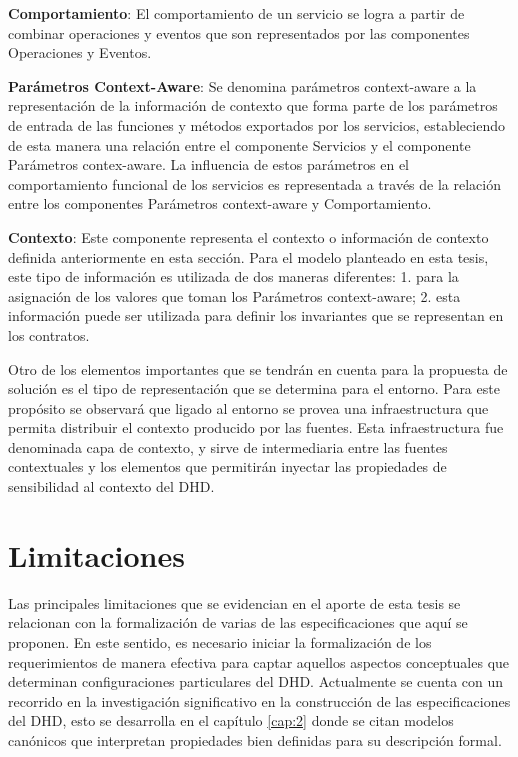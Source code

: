 {\textbf{Comportamiento}: El comportamiento de un servicio se logra a partir de
combinar operaciones y eventos que son representados por las componentes
Operaciones y Eventos. 

\textbf{Parámetros Context-Aware}: Se denomina parámetros context-aware a la
representación de la información de contexto que forma parte de los
parámetros de entrada de las funciones y métodos exportados por los servicios,
estableciendo de esta manera una relación entre el componente Servicios y el
componente Parámetros contex-aware. La influencia de estos parámetros en el
comportamiento funcional de los servicios es representada a través de
la relación entre los componentes Parámetros context-aware y Comportamiento.

\textbf{Contexto}: Este componente representa el contexto o información de
contexto definida anteriormente en esta sección. Para el modelo planteado en esta tesis, este tipo
de información es utilizada de dos maneras diferentes: 1. para la
asignación de los valores que toman los Parámetros context-aware; 2. esta información puede ser utilizada para definir los invariantes que se
representan en los contratos.

Otro de los elementos importantes que se tendrán en cuenta para la
propuesta de solución es el tipo de representación que se
determina para el entorno. Para este propósito se observará que ligado al
entorno se provea una infraestructura que permita distribuir el contexto
producido por las fuentes. Esta infraestructura fue denominada capa de contexto,
y sirve de intermediaria entre las fuentes contextuales y los elementos que
permitirán  inyectar las propiedades de sensibilidad al contexto del DHD.


\section{Limitaciones}	

Las principales limitaciones que se evidencian en el aporte de esta tesis se relacionan con la formalización de varias de las especificaciones que aquí se
proponen. En este sentido, es necesario iniciar la formalización de los
requerimientos de manera efectiva para captar aquellos aspectos conceptuales
que determinan configuraciones particulares del DHD. Actualmente se cuenta con
un recorrido en la investigación significativo en la construcción de las
especificaciones del DHD, esto se desarrolla en el capítulo
\ref{cap:2} donde se citan modelos canónicos que interpretan propiedades
bien definidas para su descripción formal. 

}
